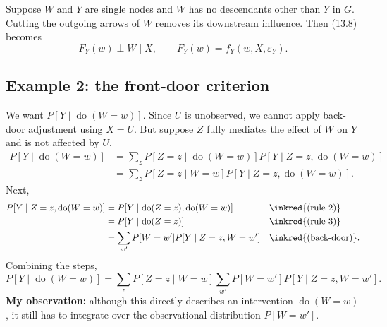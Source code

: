 Suppose $W$ and $Y$ are single nodes and $W$ has no descendants other than $Y$ in $G$. Cutting the outgoing arrows of $W$ removes its downstream influence. Then (13.8) becomes
\[
 F_Y(w)\perp W\mid X,\qquad
 F_Y(w)=f_Y(w,X,\varepsilon_Y).\tag{13.10}
\]

\subsection{Example 2: the front-door criterion}
\begin{center}
\end{center}
We want $P[Y\mid\operatorname{do}(W=w)]$. Since $U$ is unobserved, we cannot apply back-door adjustment using $X=U$. But suppose $Z$ fully mediates the effect of $W$ on $Y$ and is not affected by $U$.
\begin{align*}
 P[Y\mid\operatorname{do}(W=w)]
 &=\sum_zP[Z=z\mid\operatorname{do}(W=w)]
 P[Y\mid Z=z,\operatorname{do}(W=w)]\\
 &=\sum_zP[Z=z\mid W=w]
 P[Y\mid Z=z,\operatorname{do}(W=w)].
\end{align*}
 Next,
\begin{align*}
 P[Y\mid Z=z,\operatorname{do}(W=w)]
 &=P[Y\mid\operatorname{do}(Z=z),\operatorname{do}(W=w)]
 &&\text{\inkred{(rule 2)}}\\
 &=P[Y\mid\operatorname{do}(Z=z)]&&\text{\inkred{(rule 3)}}\\
 &=\sum_{w'}P[W=w']P[Y\mid Z=z,W=w']&&\text{\inkred{(back-door)}}.
\end{align*}
Combining the steps,
\[
 P[Y\mid\operatorname{do}(W=w)]
 =\sum_zP[Z=z\mid W=w]
 \sum_{w'}P[W=w']P[Y\mid Z=z,W=w'].\tag{13.11}
\]
\textbf{My observation:} although this directly describes an intervention $\operatorname{do}(W=w)$, it still has to integrate over the observational distribution $P[W=w']$.

